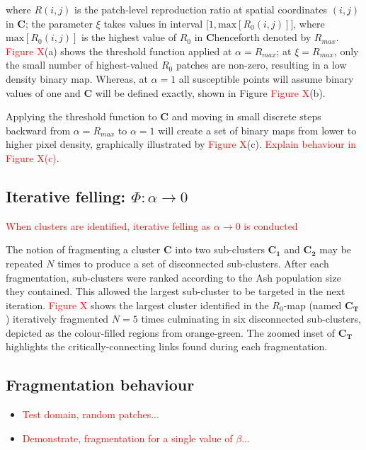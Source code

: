 where $R(i,j)$ is the patch-level reproduction ratio at spatial coordinates $(i,j)$ in $\mathbf{C}$; 
the parameter $\xi$ takes values in interval $\big[1, \mathrm{max}[R_0(i,j)]\big]$, 
where $\mathrm{max}[R_0(i, j)]$ is the highest value of $R_0$ in $\mathbf{C}$\textemdash henceforth denoted by $R_{max}$.
\textcolor{red}{Figure X}(a) shows the threshold function applied at $\alpha = R_{max}$;
at $\xi=R_{max}$, only the small number of highest-valued $R_0$ patches are non-zero, resulting in a low density binary map. 
Whereas, at $\alpha=1$ all susceptible points will assume binary values of one and $\mathbf{C}$ will be defined exactly, shown in Figure \textcolor{red}{Figure X}(b).

Applying the threshold function to $\mathbf{C}$ and moving in small discrete steps backward from $\alpha = R_{max}$ to $\alpha=1$ will create a set of binary maps from lower to higher pixel density,
graphically illustrated by \textcolor{red}{Figure X}(c).
\textcolor{red}{Explain behaviour in Figure X(c)}.

\subsection{Iterative felling: $\Phi: \alpha \rightarrow 0$}

\textcolor{red}{When clusters are identified, iterative felling as $\alpha\rightarrow 0$ is conducted}

The notion of fragmenting a cluster $\mathbf{C}$ into two sub-clusters $\mathbf{C_1}$ and $\mathbf{C_2}$ may be repeated $N$ times to produce a set of disconnected sub-clusters. 
After each fragmentation, sub-clusters were ranked according to the Ash population size they contained. 
This allowed the largest sub-cluster to be targeted in the next iteration. 
\textcolor{red}{Figure X} shows the largest cluster identified in the $R_0$-map (named $\mathbf{C_T}$) iteratively fragmented $N=5$ times culminating in six disconnected sub-clusters, 
depicted as the colour-filled regions from orange-green. 
The zoomed inset of $\mathbf{C_T}$ highlights the critically-connecting links found during each fragmentation.

\subsection{Fragmentation behaviour}

\begin{itemize}
    \item \textcolor{red}{Test domain, random patches...}
    \item \textcolor{red}{Demonstrate, fragmentation for a single value of $\beta$...}
\end{itemize}

